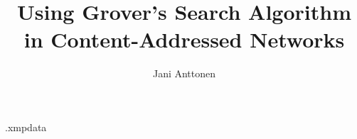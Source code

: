 \begin{filecontents*}{\jobname.xmpdata}
\end{filecontents*}
  \documentclass{wihuri}
  \usepackage[utf8]{inputenc} %
  \usepackage[T1]{fontenc}      %
  \usepackage[finnish]{babel} %
  \usepackage{tytiivis} %
  \usepackage{graphicx}%
  \usepackage{xcolor}
  \usepackage{lastpage}
  \usepackage[a-1b]{pdfx}  %
  \usepackage[pdfa]{hyperref} %
  \newcommand{\mathbi}[1]{\textbf{\em #1}}
  \newcommand{\der}{\mbox{d}}
  
  \title{Using Grover's Search Algorithm in Content-Addressed Networks}
  \author{Jani Anttonen}
  \maketitle
  \newpage
  \thispagestyle{empty}
  \vspace*{10cm}
  
  \vfill
  
  \hspace*{-2cm}\parbox{\textwidth}{Turun yliopiston laatujärjestelmän mukaisesti
    tämän julkaisun alkuperäisyys on tarkastettu Turnitin
    OriginalityCheck-järjestelmällä} 
  
  
  \newpage
  \begin{tiivistelma}%
          {Fysiikan laitos}%
          {Opiskelija, Olli}%
          {Tutkielman otsikko}
          {Pro Gradu, \pageref{LastPage} s., 3 liites.}%
          {Fysiikka}%
          {Huhtikuu 2004}%
    Tiivistä tähän !
  \end{tiivistelma}
  \tableofcontents %
  \newpage
